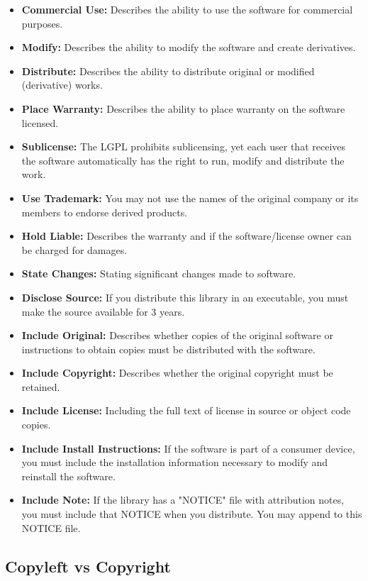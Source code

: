 \begin{itemize}
	\item \textbf{Commercial Use:} Describes the ability to use the software for commercial purposes.
	\item \textbf{Modify:} Describes the ability to modify the software and create derivatives.
	\item \textbf{Distribute:} Describes the ability to distribute original or modified (derivative) works.
	\item \textbf{Place Warranty:} Describes the ability to place warranty on the software licensed.
	\item \textbf{Sublicense:} The LGPL prohibits sublicensing, yet each user that receives the software automatically has the right to run, modify and distribute the work.
	\item \textbf{Use Trademark:} You may not use the names of the original company or its members to endorse derived products.
	\item \textbf{Hold Liable:} Describes the warranty and if the software/license owner can be charged for damages.
	\item \textbf{State Changes:} Stating significant changes made to software.
	\item \textbf{Disclose Source:} If you distribute this library in an executable, you must make the source available for 3 years.
	\item \textbf{Include Original:} Describes whether copies of the original software or instructions to obtain copies must be distributed with the software.
	\item \textbf{Include Copyright:} Describes whether the original copyright must be retained.
	\item \textbf{Include License:} Including the full text of license in source or object code copies.
	\item \textbf{Include Install Instructions:} If the software is part of a consumer device, you must include the installation information necessary to modify and reinstall the software.
	\item \textbf{Include Note:} If the library has a "NOTICE" file with attribution notes, you must include that NOTICE when you distribute. You may append to this NOTICE file.
\end{itemize}

\subsection{Copyleft vs Copyright}\label{copyleft-vs-copyright}

